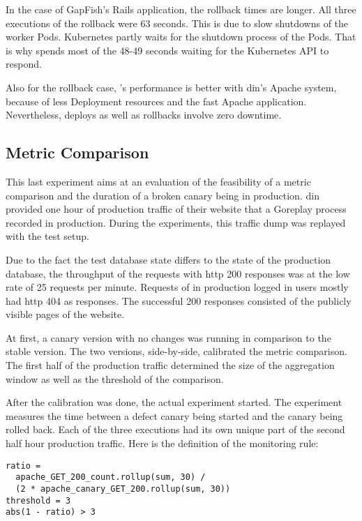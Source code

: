 In the case of GapFish's Rails application, the rollback times are longer. All three
executions of the rollback were 63 seconds. This is due to slow shutdowns of the worker
Pods. Kubernetes partly waits for the shutdown process of the Pods. That is why
\deployer{} spends most of the 48-49 seconds waiting for the Kubernetes API to respond.

Also for the rollback case, \deployer{}'s performance is better with \gls{din}'s Apache system,
because of less Deployment resources and the fast Apache application. Nevertheless,
deploys as well as rollbacks involve zero downtime.

\subsection{Metric Comparison}
\label{sec:eval_metrics}

This last experiment aims at an evaluation of the feasibility
of a metric comparison and the duration of a broken canary being in production. \gls{din}
provided one hour of production traffic of their website that a Goreplay process
recorded in production. During the experiments, this traffic dump was replayed with the test setup.

Due to the fact the test database state differs to the state of the production database, the
throughput of the requests with \gls{http} 200 responses was at the low rate of 25 requests per
minute. Requests of in production logged in users mostly had \gls{http} 404 as responses. The
successful 200 responses consisted of the publicly visible pages of the website.

At first, a canary version with no changes was running in comparison to the stable version. The
two versions, side-by-side, calibrated the metric comparison. The first half of the
production traffic determined the size of the aggregation window as well as the threshold
of the comparison.

After the calibration was done, the actual experiment started. The experiment measures the
time between a defect canary being started and the canary being rolled back. Each
of the three executions had its own unique part of the second half hour production traffic. Here is the definition of the monitoring rule:

\begin{verbatim}
ratio =
  apache_GET_200_count.rollup(sum, 30) /
  (2 * apache_canary_GET_200.rollup(sum, 30))
threshold = 3
abs(1 - ratio) > 3
\end{verbatim}

